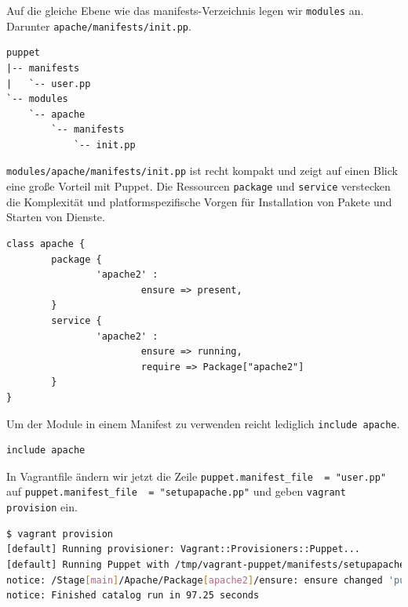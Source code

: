 \documentclass[12pt,a4paper,ngerman]{article}
\begin{document}
Auf die gleiche Ebene wie das manifests-Verzeichnis legen wir \lstinline$modules$ an. Darunter \lstinline$apache/manifests/init.pp$.
\begin{lstlisting}[language=tree,caption=Verzeichnisstruktur für den apache-Module, label=apache-module]
puppet
|-- manifests
|   `-- user.pp
`-- modules
    `-- apache
        `-- manifests
            `-- init.pp
\end{lstlisting}

\lstinline$modules/apache/manifests/init.pp$ ist recht kompakt und zeigt auf einen Blick eine große Vorteil mit Puppet. Die Ressourcen \lstinline$package$ und \lstinline$service$ verstecken die Komplexität und platformspezifische Vorgen für Installation von Pakete und Starten von Dienste.
\begin{lstlisting}[language=puppet,caption=Inhalt von modules/apache/manifests/init.pp, label=apache-init.pp]
class apache {
        package {
                'apache2' :
                        ensure => present,
        }
        service {
                'apache2' :
                        ensure => running,
                        require => Package["apache2"]
        }
}
\end{lstlisting}

Um der Module in einem Manifest zu verwenden reicht lediglich \lstinline$include apache$.
\begin{lstlisting}[language=puppet,caption=Inhalt von manifests/setupapache.pp, label=setupapache.pp]
include apache
\end{lstlisting}

In Vagrantfile ändern wir jetzt die Zeile \lstinline$puppet.manifest_file  = "user.pp"$ auf \lstinline$puppet.manifest_file  = "setupapache.pp"$ und geben \lstinline$vagrant provision$ ein.

\begin{lstlisting}[language=sh,caption=vagrant provisioning für Apache, label=provisioning_apache]
$ vagrant provision
[default] Running provisioner: Vagrant::Provisioners::Puppet...
[default] Running Puppet with /tmp/vagrant-puppet/manifests/setupapache.pp...
notice: /Stage[main]/Apache/Package[apache2]/ensure: ensure changed 'purged' to 'present'
notice: Finished catalog run in 97.25 seconds
\end{lstlisting}
\end{document}
